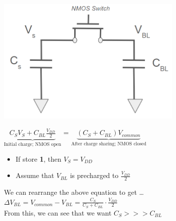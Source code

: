 \documentclass{article}
\begin{document}
\vspace{1cm}
\begin{minipage}[c]{0.5\textwidth}
    \vspace{0pt}
    \includegraphics[width=9cm, scale=1]{dramRead_alternative.PNG}
\end{minipage}%
\begin{minipage}[c]{0.5\textwidth}
    $\underbrace{C_{S}V_{S} + C_{BL} \frac{V_{DD}}{2}}_{\text{Initial charge; NMOS open}}$ 
    =
    $\underbrace{(C_{S} + C_{BL}) V_{common}}_{\text{After charge sharing; NMOS closed}}$ 

    \vspace{0.5cm}
    \begin{itemize}
        \item If store \textbf{1}, then $V_{S} = V_{DD}$
        \item Assume that $V_{BL}$ is precharged to $\frac{V_{DD}}{2}$
    \end{itemize}

    \vspace{0.5cm}
    We can rearrange the above equation to get \dots \\
    \vspace{0.25cm}
    $\Delta V_{BL} = V_{common} - V_{BL} = \frac{C_{S}}{C_{S} + C_{BL}} \cdot \frac{V_{DD}}{2}$
    \vspace{0.25cm} \\
    From this, we can see that we want $C_{S} >>> C_{BL}$

\end{minipage}
\end{document}
